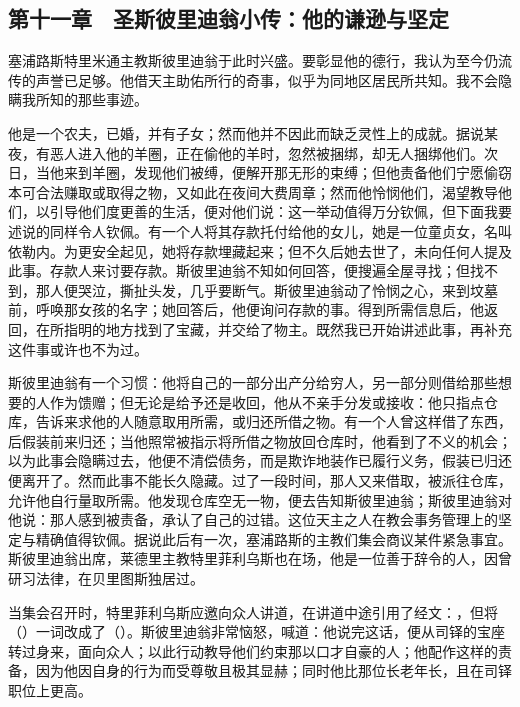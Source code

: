 \subsection{第十一章　圣斯彼里迪翁小传：他的谦逊与坚定}

塞浦路斯特里米通主教斯彼里迪翁于此时兴盛。要彰显他的德行，我认为至今仍流传的声誉已足够。他借天主助佑所行的奇事，似乎为同地区居民所共知。我不会隐瞒我所知的那些事迹。\newline{}\par

他是一个农夫，已婚，并有子女；然而他并不因此而缺乏灵性上的成就。据说某夜，有恶人进入他的羊圈，正在偷他的羊时，忽然被捆绑，却无人捆绑他们。次日，当他来到羊圈，发现他们被缚，便解开那无形的束缚；但他责备他们宁愿偷窃本可合法赚取或取得之物，又如此在夜间大费周章；然而他怜悯他们，渴望教导他们，以引导他们度更善的生活，便对他们说：这一举动值得万分钦佩，但下面我要述说的同样令人钦佩。有一个人将其存款托付给他的女儿，她是一位童贞女，名叫依勒内。为更安全起见，她将存款埋藏起来；但不久后她去世了，未向任何人提及此事。存款人来讨要存款。斯彼里迪翁不知如何回答，便搜遍全屋寻找；但找不到，那人便哭泣，撕扯头发，几乎要断气。斯彼里迪翁动了怜悯之心，来到坟墓前，呼唤那女孩的名字；她回答后，他便询问存款的事。得到所需信息后，他返回，在所指明的地方找到了宝藏，并交给了物主。既然我已开始讲述此事，再补充这件事或许也不为过。\par

斯彼里迪翁有一个习惯：他将自己的一部分出产分给穷人，另一部分则借给那些想要的人作为馈赠；但无论是给予还是收回，他从不亲手分发或接收：他只指点仓库，告诉来求他的人随意取用所需，或归还所借之物。有一个人曾这样借了东西，后假装前来归还；当他照常被指示将所借之物放回仓库时，他看到了不义的机会；以为此事会隐瞒过去，他便不清偿债务，而是欺诈地装作已履行义务，假装已归还便离开了。然而此事不能长久隐藏。过了一段时间，那人又来借取，被派往仓库，允许他自行量取所需。他发现仓库空无一物，便去告知斯彼里迪翁；斯彼里迪翁对他说：那人感到被责备，承认了自己的过错。这位天主之人在教会事务管理上的坚定与精确值得钦佩。据说此后有一次，塞浦路斯的主教们集会商议某件紧急事宜。斯彼里迪翁出席，莱德里主教特里菲利乌斯也在场，他是一位善于辞令的人，因曾研习法律，在贝里图斯独居过。\par

当集会召开时，特里菲利乌斯应邀向众人讲道，在讲道中途引用了经文：，但将（）一词改成了（）。斯彼里迪翁非常恼怒，喊道：他说完这话，便从司铎的宝座转过身来，面向众人；以此行动教导他们约束那以口才自豪的人；他配作这样的责备，因为他因自身的行为而受尊敬且极其显赫；同时他比那位长老年长，且在司铎职位上更高。\par

